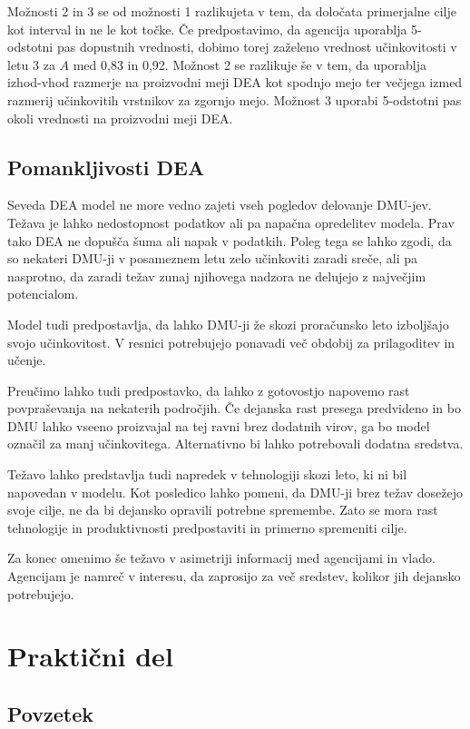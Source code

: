 \documentclass[12pt,a4paper]{article}
\theoremstyle{definition}
\begin{document}
Možnosti 2 in 3 se od možnosti 1 razlikujeta v tem, da
določata primerjalne cilje kot interval in ne le kot točke.
Če predpostavimo, da agencija uporablja 5-odstotni pas 
dopustnih vrednosti, dobimo torej zaželeno vrednost 
učinkovitosti v letu 3 za $A$ med 0{,}83 in 0{,}92.
Možnost 2 se razlikuje še v tem, da uporablja
izhod-vhod razmerje na proizvodni meji DEA kot
spodnjo mejo ter večjega izmed razmerij učinkovitih
vrstnikov za zgornjo mejo. Možnost 3 uporabi 5-odstotni
pas okoli vrednosti na proizvodni meji DEA. 
\cite{Yaisawarng2002}

\subsection{Pomankljivosti DEA}

Seveda DEA model ne more vedno zajeti vseh pogledov
delovanje DMU-jev. Težava je lahko nedostopnost
podatkov ali pa napačna opredelitev modela.
Prav tako DEA ne dopušča šuma ali napak v podatkih.
Poleg tega se lahko zgodi, da so nekateri DMU-ji v
posameznem letu zelo učinkoviti zaradi sreče, ali pa
nasprotno, da zaradi težav zunaj njihovega nadzora
ne delujejo z največjim potencialom.

Model tudi predpostavlja, da lahko DMU-ji že skozi
proračunsko leto izboljšajo svojo učinkovitost. V
resnici potrebujejo ponavadi več obdobij za prilagoditev
in učenje. 

Preučimo lahko tudi predpostavko, da lahko z gotovostjo
napovemo rast povpraševanja na nekaterih področjih. Če
dejanska rast presega predvideno in bo DMU lahko vseeno
proizvajal na tej ravni brez dodatnih virov, ga bo
model označil za manj učinkovitega. Alternativno bi
lahko potrebovali dodatna sredstva.

Težavo lahko predstavlja tudi napredek v tehnologiji
skozi leto, ki ni bil napovedan v modelu. Kot posledico
lahko pomeni, da DMU-ji brez težav dosežejo svoje cilje,
ne da bi dejansko opravili potrebne spremembe. Zato se
mora rast tehnologije in produktivnosti predpostaviti 
in primerno spremeniti cilje.

Za konec omenimo še težavo v asimetriji informacij med
agencijami in vlado. Agencijam je namreč v interesu,
da zaprosijo za več sredstev, kolikor jih dejansko 
potrebujejo. 

\section{Praktični del}

\subsection{Povzetek}
\end{document}
